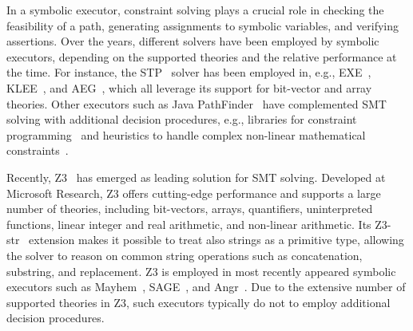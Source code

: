 
In a symbolic executor, constraint solving plays a crucial role in checking the feasibility of a path, generating assignments to symbolic variables, and verifying assertions.
%
Over the years, different solvers have been employed by symbolic executors, depending on the supported theories and the relative performance at the time. For instance, the STP~\cite{STP-CAV07} solver has been employed in, e.g., {\sc EXE}~\cite{EXE-CCS06}, {\sc KLEE}~\cite{KLEE-OSDI08}, and {\sc AEG}~\cite{AEG-NDSS11}, which all leverage its support for bit-vector and array theories. Other executors such as {\sc Java PathFinder}~\cite{PATHFINDER-ASE10} have complemented SMT solving with additional decision procedures, e.g., libraries for constraint programming~\cite{CHOCO} and heuristics to handle complex non-linear mathematical constraints~\cite{CORAL-NFM11}.

Recently, Z3~\cite{Z3-TACS08} has emerged as leading solution for SMT solving. Developed at Microsoft Research, Z3 offers cutting-edge performance and supports a large number of theories, including bit-vectors, arrays, quantifiers, uninterpreted functions, linear integer and real arithmetic, and non-linear arithmetic. 
%
Its Z3-str~\cite{ZZG-FSE13} extension makes it possible to treat also strings as a primitive type, allowing the solver to reason on common string operations such as concatenation, substring, and replacement.
%
Z3 is employed in most recently appeared symbolic executors such as {\sc Mayhem}~\cite{MAYHEM-SP12}, {\sc SAGE}~\cite{SAGE-QUEUE12}, and {\sc Angr}~\cite{ANGR-SSP16}. Due to the extensive number of supported theories in Z3, such executors typically do not to employ additional decision procedures.

